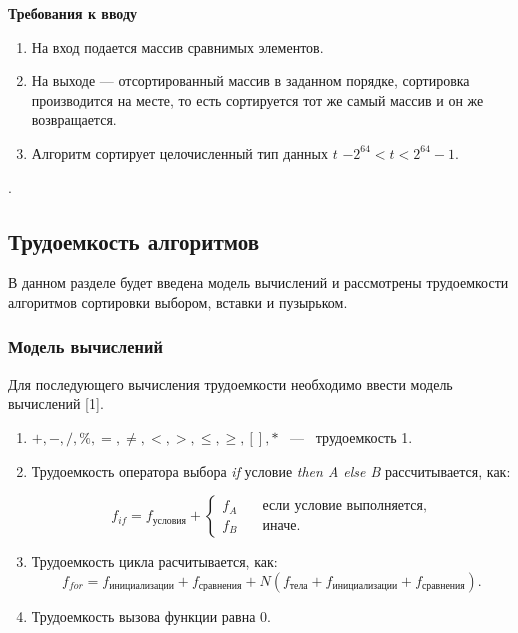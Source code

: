 \documentclass[14pt,russian]{scrartcl}
\begin{document}
\textbf{Требования к вводу}
		
\begin{enumerate}
	\item На вход подается массив сравнимых элементов.
	\item На выходе --- отсортированный массив в заданном порядке, сортировка производится на месте, то есть сортируется тот же самый массив и он же возвращается.
	\item Алгоритм сортирует целочисленный тип данных $t$ $-2^{64} < t < 2^{64} - 1$.
\end{enumerate}.

\subsection{Трудоемкость алгоритмов}

В данном разделе будет введена модель вычислений и рассмотрены трудоемкости алгоритмов сортировки выбором, вставки и пузырьком.

\subsubsection{Модель вычислений}

Для последующего вычисления трудоемкости необходимо ввести модель вычислений [1].

\begin{enumerate}
    \item $+, -, /, \%, =, \neq, <, >, \leq, \geq, [ ], *$ ~---~ трудоемкость 1.
    \item Трудоемкость оператора выбора \textit{if} условие \textit{then A else B} рассчитывается, как: 
    
    \begin{equation}
        f_{if} = f_{\text{условия}} + \begin{cases}
                                f_A & \quad \text{если условие выполняется,} \\
                                f_B & \quad \text{иначе}.
                                \end{cases}
    \end{equation}

    \item Трудоемкость цикла расчитывается, как:
    \begin{equation}
        f_{for} = f_{\text{инициализации}} + f_{\text{сравнения}} + N(f_{\text{тела}} + f_{\text{инициализации}} + f_{\text{сравнения}}).
    \end{equation}

    \item Трудоемкость вызова функции равна 0.
\end{enumerate}
\end{document}
